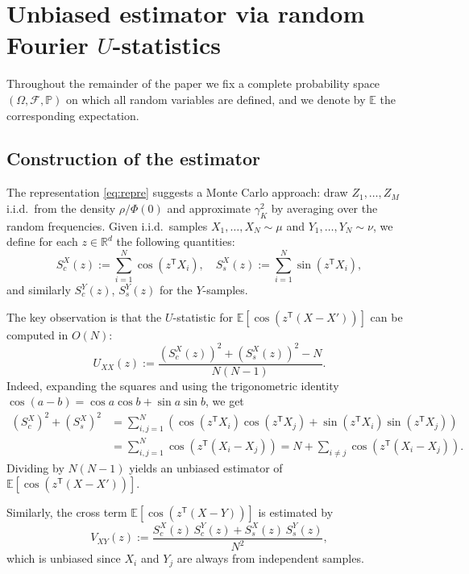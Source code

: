 \documentclass[11pt,leqno]{article}
\theoremstyle{plain}
\theoremstyle{remark}
\theoremstyle{definition}
\numberwithin{equation}{section}
\numberwithin{figure}{section}
\numberwithin{table}{section}
\numberwithin{algorithm}{section}
\newcommand{\EE}{\mathbb{E}}
\newcommand{\RR}{\mathbb{R}}
\newcommand{\PP}{\mathbb{P}}
\begin{document}
\section{Unbiased estimator via random Fourier $U$-statistics}\label{sec:3}

Throughout the remainder of the paper we fix a complete probability space $(\Omega,\mathcal{F},\PP)$
on which all random variables are defined,
and we denote by $\EE$ the corresponding expectation.

\subsection{Construction of the estimator}\label{sec:3.1}

The representation \eqref{eq:repre} suggests a Monte Carlo approach:
draw $Z_1,\ldots,Z_M$ i.i.d.\ from the density $\rho/\Phi(0)$ and approximate $\gamma_K^2$ by averaging over the random frequencies.
Given i.i.d.\ samples $X_1,\ldots,X_N\sim\mu$ and $Y_1,\ldots,Y_N\sim\nu$,
we define for each $z\in\RR^d$ the following quantities:
\begin{equation}
\label{eq:3.1}
 S_c^X(z) := \sum_{i=1}^N\cos(z^{\mathsf{T}}X_i), \quad
 S_s^X(z) := \sum_{i=1}^N\sin(z^{\mathsf{T}}X_i),
\end{equation}
and similarly $S_c^Y(z)$, $S_s^Y(z)$ for the $Y$-samples.

The key observation is that the $U$-statistic for $\EE[\cos(z^{\mathsf{T}}(X-X'))]$ can be computed in $O(N)$:
\begin{equation}
\label{eq:3.2}
 U_{XX}(z) := \frac{(S_c^X(z))^2 + (S_s^X(z))^2 - N}{N(N-1)}.
\end{equation}
Indeed, expanding the squares and using the trigonometric identity $\cos(a-b) = \cos a\cos b + \sin a\sin b$, we get 
\begin{align*}
 (S_c^X)^2 + (S_s^X)^2
 &= \sum_{i,j=1}^N (\cos(z^{\mathsf{T}}X_i)\cos(z^{\mathsf{T}}X_j) + \sin(z^{\mathsf{T}}X_i)\sin(z^{\mathsf{T}}X_j)) \\
 &= \sum_{i,j=1}^N \cos(z^{\mathsf{T}}(X_i - X_j)) = N + \sum_{i\neq j}\cos(z^{\mathsf{T}}(X_i - X_j)).
\end{align*}
Dividing by $N(N-1)$ yields an unbiased estimator of $\EE[\cos(z^{\mathsf{T}}(X-X'))]$.

Similarly, the cross term $\EE[\cos(z^{\mathsf{T}}(X-Y))]$ is estimated by
\begin{equation}
\label{eq:3.3}
 V_{XY}(z) := \frac{S_c^X(z)\,S_c^Y(z) + S_s^X(z)\,S_s^Y(z)}{N^2},
\end{equation}
which is unbiased since $X_i$ and $Y_j$ are always from independent samples.
\end{document}
